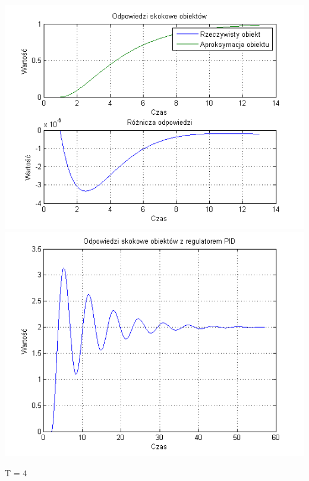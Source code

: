 \documentclass[10pt,a4paper]{article}
\begin{document}
\begin{center}
\includegraphics[scale=1]{images/dwa/skrypt_65.png}\\
\includegraphics[scale=1]{images/dwa/skrypt_66.png}\\
\end{center}
\newpage
T = 4
\end{document}
